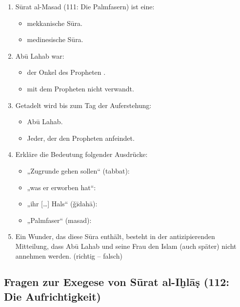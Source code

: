 \begin{enumerate}[leftmargin=1.6em,resume]
\item Sūrat al-Masad (111: Die Palmfasern) ist eine:
  \begin{itemize}
    \item mekkanische Sūra. \item medinesische Sūra.
  \end{itemize}
\item Abū Lahab war:
  \begin{itemize}
    \item der Onkel des Propheten .
    \item mit dem Propheten  nicht verwandt.
  \end{itemize}
\item Getadelt wird bis zum Tag der Auferstehung:
  \begin{itemize}
    \item Abū Lahab.
    \item Jeder, der den Propheten  anfeindet.
  \end{itemize}
\item Erkläre die Bedeutung folgender Ausdrücke:
  \begin{itemize}
    \item „Zugrunde gehen sollen“ (tabbat): \dotfill
    \item „was er erworben hat“: \dotfill
    \item „ihr […] Hals“ (ǧīdahā): \dotfill
    \item „Palmfaser“ (masad): \dotfill
  \end{itemize}
\item Ein Wunder, das diese Sūra enthält, besteht in der antizipierenden Mitteilung, dass Abū
  Lahab und seine Frau den Islam (auch später) nicht annehmen werden. (richtig -- falsch)
\end{enumerate}

\subsection*{Fragen zur Exegese von Sūrat al-Iḫlāṣ (112: Die Aufrichtigkeit)}

